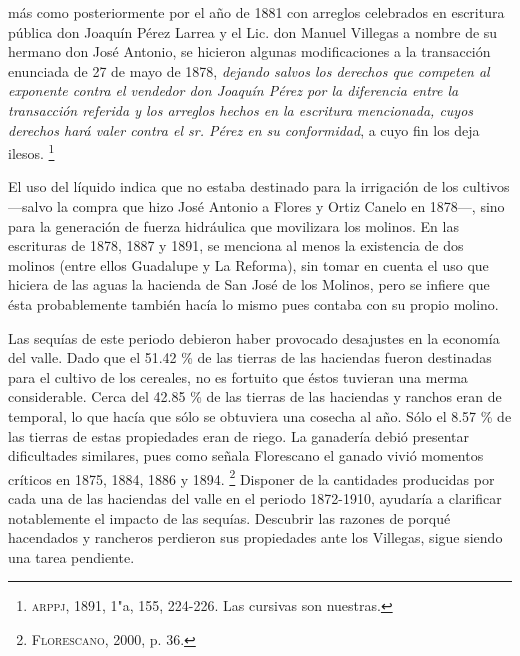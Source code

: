 \documentclass[14pt,twoside,final]{extbook} %
\let\oldfootnote\footnote
\renewcommand\footnote[1]{%
\oldfootnote{\hspace{1mm}#1}}
\begin{document}
\begin{quoting}
más como posteriormente por el año de 1881 con arreglos celebrados en escritura pública don Joaquín Pérez Larrea y el Lic. don Manuel Villegas a nombre de su hermano don José Antonio, se hicieron algunas modificaciones a la transacción enunciada de 27 de mayo de 1878, \emph{dejando salvos los derechos que competen al exponente contra el vendedor don Joaquín Pérez por la diferencia entre la transacción referida y los arreglos hechos en la escritura mencionada, cuyos derechos hará valer contra el sr. Pérez en su conformidad}, a cuyo fin los deja ilesos.\footnote{\textsc{arppj}, 1891, 1"a, 155, 224-226. Las cursivas son nuestras.}
\end{quoting}
El uso del líquido indica que no estaba destinado para la irrigación de los cultivos ---salvo la compra que hizo José Antonio a Flores y Ortiz Canelo en 1878---, sino para la generación de fuerza hidráulica que movilizara los molinos. En las escrituras de 1878, 1887 y 1891, se menciona al menos la existencia de dos molinos (entre ellos Guadalupe y La Reforma), sin tomar en cuenta el uso que hiciera de las aguas la hacienda de San José de los Molinos, pero se infiere que ésta probablemente
también hacía lo mismo pues contaba con su propio molino.

Las sequías de este periodo debieron haber provocado desajustes en la economía del valle. Dado que el 51.42 \% de las tierras de las haciendas fueron destinadas para el cultivo de los cereales, no es fortuito que éstos tuvieran una merma considerable. Cerca del 42.85 \% de las tierras de las haciendas y ranchos eran de temporal, lo que hacía que sólo se obtuviera una cosecha al año. Sólo el 8.57 \% de las tierras de estas propiedades eran de riego. La ganadería debió presentar dificultades similares, pues como señala Florescano el ganado vivió momentos críticos en 1875, 1884, 1886 y 1894.\footnote{\textsc{Florescano}, 2000, p. 36.} Disponer de la cantidades producidas por cada una de las haciendas del valle en el periodo 1872-1910, ayudaría a clarificar notablemente el impacto de las sequías. Descubrir las razones de porqué hacendados y rancheros perdieron sus propiedades ante los Villegas, sigue siendo una tarea pendiente.
\end{document}
